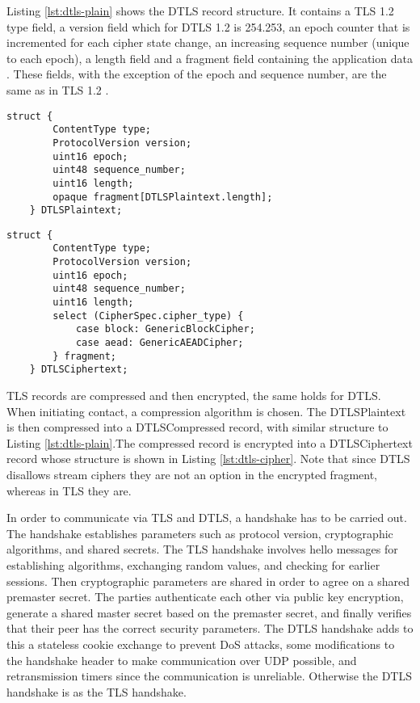 \documentclass[0-thesis.tex]{subfiles}
\begin{document}
Listing \ref{lst:dtls-plain} shows the DTLS record structure. It contains a TLS 1.2 type
field, a version field which for DTLS 1.2 is 254.253, an epoch counter that is incremented
for each cipher state change, an increasing sequence number (unique to each epoch), a
length field and a fragment field containing the application data \parencite{rfc5246}.
These fields, with the exception of the epoch and sequence number, are the same 
as in TLS 1.2 \parencite{rfc6347}.

\lstset{language=C}
\begin{lstlisting}[caption={The DTLS plaintext record structure.}, 
                    label={lst:dtls-plain}]
    struct {
        ContentType type;
        ProtocolVersion version;
        uint16 epoch;
        uint48 sequence_number;
        uint16 length;
        opaque fragment[DTLSPlaintext.length];
    } DTLSPlaintext;
\end{lstlisting}

\begin{lstlisting}[caption={The DTLS ciphertext record structure.}, 
                    label={lst:dtls-cipher}]
    struct {
        ContentType type;
        ProtocolVersion version;
        uint16 epoch;
        uint48 sequence_number;
        uint16 length;
        select (CipherSpec.cipher_type) {
            case block: GenericBlockCipher;
            case aead: GenericAEADCipher;
        } fragment;
    } DTLSCiphertext;
\end{lstlisting}

TLS records are compressed and then encrypted, the same holds for DTLS. When initiating
contact, a compression algorithm is chosen. The DTLSPlaintext is then compressed into a
DTLSCompressed record, with similar structure to Listing \ref{lst:dtls-plain}.The
compressed record is encrypted into a DTLSCiphertext record whose structure is shown in
Listing \ref{lst:dtls-cipher}. Note that since DTLS disallows stream ciphers they are not
an option in the encrypted fragment, whereas in TLS they are.

In order to communicate via TLS and DTLS, a handshake has to be carried out. The handshake
establishes parameters such as protocol version, cryptographic algorithms, and shared
secrets. The TLS handshake involves hello messages for establishing algorithms, exchanging
random values, and checking for earlier sessions. Then cryptographic parameters are shared
in order to agree on a shared premaster secret. The parties authenticate each other via
public key encryption, generate a shared master secret based on the premaster secret, and
finally verifies that their peer has the correct security parameters. The DTLS handshake
adds to this a stateless cookie exchange to prevent DoS attacks, some modifications to the
handshake header to make communication over UDP possible, and retransmission timers since
the communication is unreliable. Otherwise the DTLS handshake is as the TLS handshake.
\end{document}
